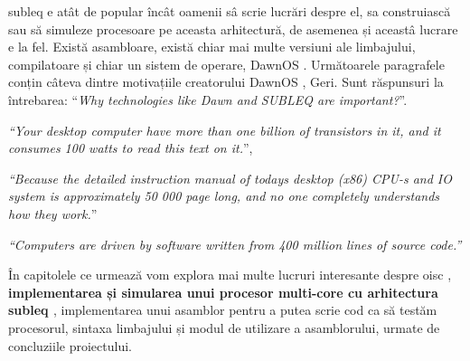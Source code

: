 \documentclass[../main.tex]{subfiles}
\begin{document}
\acrshort{subleq} e atât de popular încât oamenii sâ scrie lucrări despre el, sa construiască sau să simuleze procesoare
pe aceasta arhitectură, de asemenea și aceastâ lucrare e la fel. Există asambloare, există chiar mai multe versiuni ale
limbajului, compilatoare și chiar un sistem de operare, DawnOS \cite{dawn}. Următoarele paragrafele conțin câteva dintre 
motivațiile creatorului DawnOS \cite{dawn}, Geri. Sunt răspunsuri la întrebarea:
``\emph{Why technologies like Dawn and SUBLEQ are important?}''.

\emph{``Your desktop computer have more than one billion of transistors in it, and it consumes 100 watts to read this text on it.}'',

\emph{``Because the detailed instruction manual of todays desktop (x86) CPU-s and IO system is approximately 50 000 page long, and no one completely understands how they work.}''

\emph{``Computers are driven by software written from 400 million lines of source code.''}

În capitolele ce urmează vom explora mai multe lucruri interesante despre \acrshort{oisc} \cite{oisc}, \textbf{implementarea și
simularea unui procesor multi-core cu arhitectura \acrshort{subleq} \cite{subleq}}, implementarea unui asamblor pentru a putea
scrie cod ca să testăm procesorul, sintaxa limbajului și modul de utilizare a asamblorului, urmate de concluziile proiectului.
\end{document}
